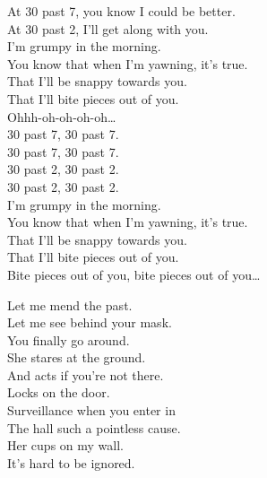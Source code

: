 
At 30 past 7, you know I could be better. \\
At 30 past 2, I'll get along with you. \\
I'm grumpy in the morning. \\
You know that when I'm yawning, it's true. \\

That I'll be snappy towards you. \\
That I'll bite pieces out of you. \\

Ohhh-oh-oh-oh-oh… \\

30 past 7, 30 past 7. \\
30 past 7, 30 past 7. \\
30 past 2, 30 past 2. \\
30 past 2, 30 past 2. \\
I'm grumpy in the morning. \\
You know that when I'm yawning, it's true. \\

That I'll be snappy towards you. \\
That I'll bite pieces out of you. \\

Bite pieces out of you, bite pieces out of you… \\





Let me mend the past. \\
Let me see behind your mask. \\
You finally go around. \\
She stares at the ground. \\
And acts if you're not there. \\

Locks on the door. \\
Surveillance when you enter in \\
The hall such a pointless cause. \\
Her cups on my wall. \\
It's hard to be ignored. \\

